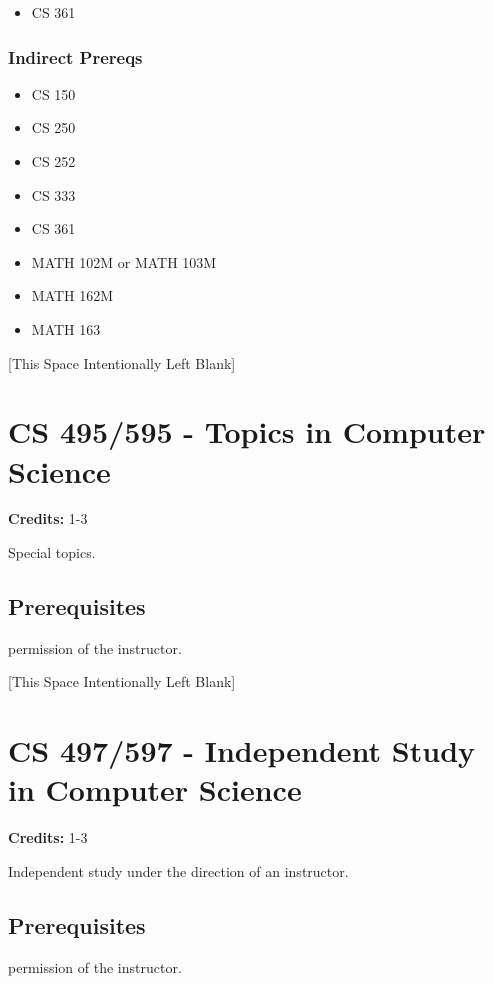 \documentclass[]{article}
\providecommand{\tightlist}{%
  \setlength{\itemsep}{0pt}\setlength{\parskip}{0pt}}
\newcommand{\pagebreakhere}{
\vspace*{\fill}
\begin{center}
[This Space Intentionally Left Blank]
\end{center}
\vspace*{\fill}
\newpage
}
\begin{document}
\begin{itemize}
\tightlist
\item
  CS 361
\end{itemize}

\subsubsection{Indirect Prereqs}\label{indirect-prereqs-42}

\begin{itemize}
\tightlist
\item
  CS 150
\item
  CS 250
\item
  CS 252
\item
  CS 333
\item
  CS 361
\item
  MATH 102M or MATH 103M
\item
  MATH 162M
\item
  MATH 163
\end{itemize}

\pagebreakhere
\section{CS 495/595 - Topics in Computer
Science}\label{cs-495595---topics-in-computer-science}

\textbf{Credits:} 1-3

Special topics.

\subsection{Prerequisites}\label{prerequisites-52}

permission of the instructor.

\pagebreakhere
\section{CS 497/597 - Independent Study in Computer
Science}\label{cs-497597---independent-study-in-computer-science}

\textbf{Credits:} 1-3

Independent study under the direction of an instructor.

\subsection{Prerequisites}\label{prerequisites-53}

permission of the instructor.
\end{document}
